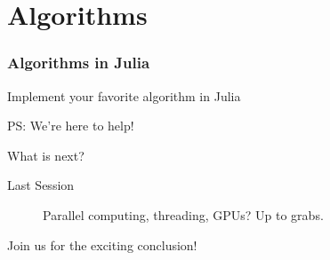 \documentclass{beamer}
\begin{document}
\section{Algorithms}
\begin{frame}
\frametitle{Algorithms in Julia}

\pause
\begin{center}
\huge{Implement your favorite algorithm in Julia}

\vspace{0.5cm}
\small PS: We're here to help!
\end{center}

\end{frame}

\begin{frame}{What is next?}
  \begin{description}
    \item[Last Session] Parallel computing, threading, GPUs? Up to grabs.
  \end{description}

Join us for the exciting conclusion!
\end{frame}
\end{document}
